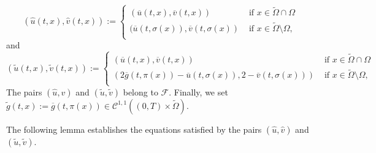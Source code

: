 \documentclass[reqno,12pt,twoside]{amsart}
\numberwithin{equation}{section} \numberwithin{theorem}{section}
\numberwithin{proposition}{section} \numberwithin{lemma}{section}
\numberwithin{corollary}{section}
\numberwithin{definition}{section} \numberwithin{remark}{section}
\begin{document}
\begin{equation}\label{def : u chapeau}
(\hat{u}(t,x),\hat{v}(t,x))  := \left\{ \begin{array}{ll}
(\overline{u}(t,x), \overline{v}(t,x))  & \text{ if } x\in \widetilde{\Omega} \cap \Omega \\
(\overline{u} (t,\sigma (x)), \overline{v} (t,\sigma(x)) & \text{ if } x\in \widetilde{\Omega} \setminus \Omega,\\
\end{array} \right.
\end{equation}
and 
\begin{equation}\label{def : u tilde}
(\widetilde{u}(t,x), \widetilde{v}(t,x)) := \left\{ \begin{array}{ll}
(\overline{u} (t,x), \overline{v}(t,x)) & \text{ if } x\in \widetilde{\Omega} \cap \Omega \\
(2 \overline{g}(t,\pi(x))- \overline{u} (t,\sigma (x)), 2-\overline{v}(t,\sigma(x))) & \text{ if } x\in \widetilde{\Omega} \setminus \Omega,\\
\end{array} \right.
\end{equation}
The pairs $(\hat{u}, \hat{v})$ and $(\widetilde{u}, \widetilde{v})$ belong to $\mathcal{F}$. 
Finally, we set $\widetilde{g}(t,x) := \overline{g}(t, \pi(x)) \in \mathcal{C}^{1,1}((0,T) \times \widetilde{\Omega})$. 

\smallskip

The following lemma establishes the equations satisfied by the pairs $(\hat{u} , \hat{v})$ and $(\widetilde{u} , \widetilde{v} )$. 

\medskip
\end{document}
